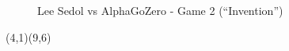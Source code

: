\documentclass{article}
\begin{document}
  \setgounit{0.7cm}

  \begin{figure}[!thbp]
    \begin{center}
      \begin{psgoboard*}[19]
      \end{psgoboard*}
      \caption{Lee Sedol vs AlphaGoZero {-} Game 2 (``Invention'')}\label{Figure:LS-vs-AG-Game2}
    \end{center}
  \end{figure}

  \begin{psgopartialboard}[9]{(4,1)(9,6)} %
  \end{psgopartialboard}
\end{document}

